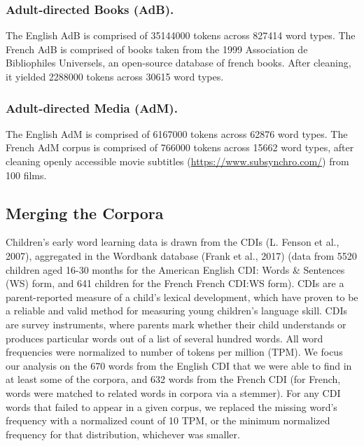 \documentclass[10pt, letterpaper]{article}
\begin{document}
\hypertarget{adult-directed-books-adb.}{%
\subsubsection{Adult-directed Books
(AdB).}\label{adult-directed-books-adb.}}

The English AdB is comprised of 35144000 tokens across 827414 word
types. The French AdB is comprised of books taken from the 1999
Association de Bibliophiles Universels, an open-source database of
french books. After cleaning, it yielded 2288000 tokens across 30615
word types.

\hypertarget{adult-directed-media-adm.}{%
\subsubsection{Adult-directed Media
(AdM).}\label{adult-directed-media-adm.}}

The English AdM is comprised of 6167000 tokens across 62876 word types.
The French AdM corpus is comprised of 766000 tokens across 15662 word
types, after cleaning openly accessible movie subtitles
(\url{https://www.subsynchro.com/}) from 100 films.

\hypertarget{merging-the-corpora}{%
\subsection{Merging the Corpora}\label{merging-the-corpora}}

Children's early word learning data is drawn from the CDIs (L. Fenson et
al., 2007), aggregated in the Wordbank database (Frank et al., 2017)
(data from 5520 children aged 16-30 months for the American English CDI:
Words \& Sentences (WS) form, and 641 children for the French French
CDI:WS form). CDIs are a parent-reported measure of a child's lexical
development, which have proven to be a reliable and valid method for
measuring young children's language skill. CDIs are survey instruments,
where parents mark whether their child understands or produces
particular words out of a list of several hundred words. All word
frequencies were normalized to number of tokens per million (TPM). We
focus our analysis on the 670 words from the English CDI that we were
able to find in at least some of the corpora, and 632 words from the
French CDI (for French, words were matched to related words in corpora
via a stemmer). For any CDI words that failed to appear in a given
corpus, we replaced the missing word's frequency with a normalized count
of 10 TPM, or the minimum normalized frequency for that distribution,
whichever was smaller.
\end{document}
